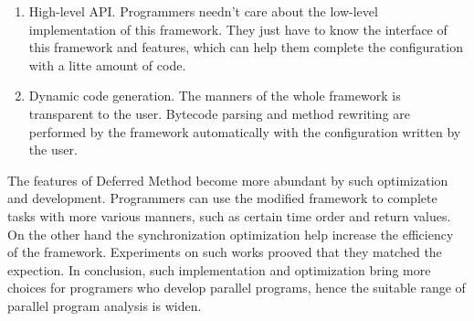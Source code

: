 \begin{englishabstract}
\begin{enumerate}
	\item High-level API. Programmers needn't care about the low-level implementation of this framework. They just have to know the interface of this framework and features, which can help them complete the configuration with a litte amount of code.
	\item Dynamic code generation. The manners of the whole framework is transparent to the user. Bytecode parsing and method rewriting are performed by the framework automatically with the configuration written by the user.
\end{enumerate}

The features of Deferred Method become more abundant by such optimization and development. Programmers can use the modified framework to complete tasks with more various manners, such as certain time order and return values. On the other hand the synchronization optimization help increase the efficiency of the framework. Experiments on such works prooved that they matched the expection. In conclusion, such implementation and optimization bring more choices for programers who develop parallel programs, hence the suitable range of parallel program analysis is widen.

\end{englishabstract}
